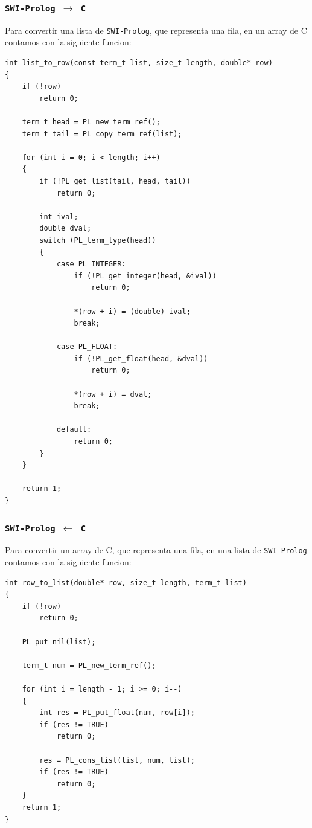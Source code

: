 \documentclass[a4paper]{article}
\begin{document}
\subsubsection{\texttt{SWI-Prolog $\longrightarrow$ C}}
Para convertir una lista de \texttt{SWI-Prolog}, que representa una fila, en un array de C contamos con la siguiente funcion:
\begin{lstlisting}[style=C++]
int list_to_row(const term_t list, size_t length, double* row)
{
    if (!row)
        return 0;

    term_t head = PL_new_term_ref();
    term_t tail = PL_copy_term_ref(list);

    for (int i = 0; i < length; i++)
    {
        if (!PL_get_list(tail, head, tail))
            return 0;

        int ival;
        double dval;
        switch (PL_term_type(head))
        {
            case PL_INTEGER:
                if (!PL_get_integer(head, &ival))
                    return 0;

                *(row + i) = (double) ival;
                break;
            
            case PL_FLOAT:
                if (!PL_get_float(head, &dval))
                    return 0;

                *(row + i) = dval;
                break;

            default:
                return 0;
        }
    }
    
    return 1;
}
\end{lstlisting}

\subsubsection{\texttt{SWI-Prolog $\longleftarrow$ C}}
Para convertir un array de C, que representa una fila, en una lista de \texttt{SWI-Prolog} contamos con la siguiente funcion:
\begin{lstlisting}[style=C++]
int row_to_list(double* row, size_t length, term_t list)
{
    if (!row)
        return 0;

    PL_put_nil(list);

    term_t num = PL_new_term_ref();
    
    for (int i = length - 1; i >= 0; i--)
    {
        int res = PL_put_float(num, row[i]);
        if (res != TRUE)
            return 0;

        res = PL_cons_list(list, num, list);
        if (res != TRUE)
            return 0;
    }
    return 1;
}
\end{lstlisting}
\end{document}
